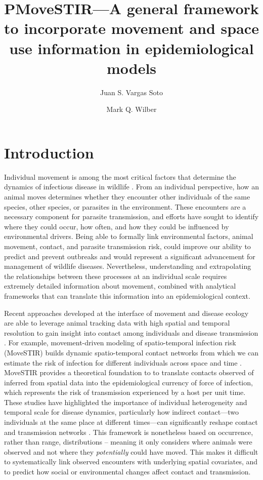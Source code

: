 \documentclass[letterpaper]{article}
\title{PMoveSTIR---A general framework to incorporate movement and space use information in epidemiological models}
\author{Juan S. Vargas Soto \and Mark Q. Wilber}
\affil{School of Natural Resources, University of Tennessee, Knoxville, TN}
\date{}
\begin{document}
\maketitle

\section*{Introduction}

Individual movement is among the most critical factors that determine the dynamics of infectious disease in wildlife \citep{Manlove2022,Dougherty2022}. 
From an individual perspective, how an animal moves determines whether they encounter other individuals of the same species, other species, or parasites in the environment. 
These encounters are a necessary component for parasite transmission, and efforts have sought to identify where they could occur, how often, and how they could be influenced by environmental drivers. 
Being able to formally link environmental factors, animal movement, contact, and parasite transmission risk, could improve our ability to predict and prevent outbreaks and would represent a significant advancement for management of wildlife diseases.  
Nevertheless, understanding and extrapolating the relationships between these processes at an individual scale requires extremely detailed information about movement, combined with analytical frameworks that can translate this information into an epidemiological context.

Recent approaches developed at the interface of movement and disease ecology are able to leverage animal tracking data with high spatial and temporal resolution to gain insight into contact among individuals and disease transmission \citep{Wilber2022,Yang2023}. For example, movement-driven modeling of spatio-temporal infection risk (MoveSTIR) builds dynamic spatio-temporal contact networks from which we can estimate the risk of infection for different individuals across space and time \citep{Wilber2022}. MoveSTIR provides a theoretical foundation to to translate contacts observed of inferred from spatial data into the epidemiological currency of force of infection, which represents the risk of transmission experienced by a host per unit time. These studies have highlighted the importance of individual heterogeneity and temporal scale for disease dynamics, particularly how indirect contact---two individuals at the same place at different times---can significantly reshape contact and transmission networks \citep{Wilber2022,Yang2023}. This framework is nonetheless based on occurrence, rather than range, distributions \citep[in the terminology of ][]{Alston2022} -- meaning it only considers where animals were observed and not where they \emph{potentially} could have moved. This makes it difficult to systematically link observed encounters with underlying spatial covariates, and to predict how social or environmental changes affect contact and transmission. 
\end{document}
